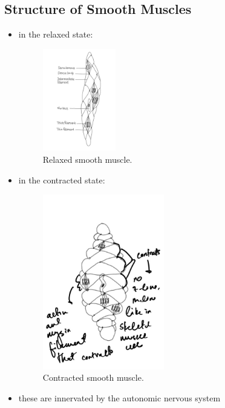 \documentclass[10pt]{article}
\begin{document}
\subsection{Structure of Smooth Muscles}
\begin{itemize}
    \item in the relaxed state:
        \begin{figure}[H]
            \centering
            \includegraphics[width=0.3\textwidth]{smoothMuscleRelaxed.jpeg}
            \caption{Relaxed smooth muscle.}
            \label{fig:smoothMuscleRelaxed}
        \end{figure}
    \item in the contracted state: 
        \begin{figure}[H]
            \centering
            \includegraphics[width=0.5\textwidth]{smoothMuscleContracted.jpeg}
            \caption{Contracted smooth muscle.}
            \label{fig:smoothMuscleContracted}
        \end{figure}
    \item these are innervated by the autonomic nervous system 

\end{itemize}
\end{document}
